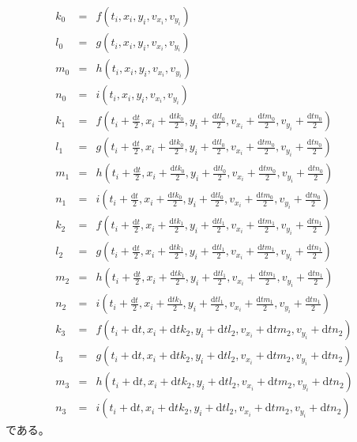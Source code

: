 \documentclass[a4paper,twoside]{jarticle}
\begin{document}
\begin{align}
  k_0&=&f\left(t_i,x_i,y_i,v_{x_{i}},v_{y_{i}}\right)\\
  l_0&=&g\left(t_i,x_i,y_i,v_{x_{i}},v_{y_{i}}\right)\\
  m_0&=&h\left(t_i,x_i,y_i,v_{x_{i}},v_{y_{i}}\right)\\
  n_0&=&i\left(t_i,x_i,y_i,v_{x_{i}},v_{y_{i}}\right)\\
  k_1&=&f\left(t_i+\frac{\mathrm{d}t}{2},x_i+\frac{\mathrm{d}tk_0}{2},y_i+\frac{\mathrm{d}tl_0}{2},v_{x_{i}}+\frac{\mathrm{d}tm_0}{2},v_{y_{i}}+\frac{\mathrm{d}tn_0}{2}\right)\\
  l_1&=&g\left(t_i+\frac{\mathrm{d}t}{2},x_i+\frac{\mathrm{d}tk_0}{2},y_i+\frac{\mathrm{d}tl_0}{2},v_{x_{i}}+\frac{\mathrm{d}tm_0}{2},v_{y_{i}}+\frac{\mathrm{d}tn_0}{2}\right)\\
  m_1&=&h\left(t_i+\frac{\mathrm{d}t}{2},x_i+\frac{\mathrm{d}tk_0}{2},y_i+\frac{\mathrm{d}tl_0}{2},v_{x_{i}}+\frac{\mathrm{d}tm_0}{2},v_{y_{i}}+\frac{\mathrm{d}tn_0}{2}\right)\\
  n_1&=&i\left(t_i+\frac{\mathrm{d}t}{2},x_i+\frac{\mathrm{d}tk_0}{2},y_i+\frac{\mathrm{d}tl_0}{2},v_{x_{i}}+\frac{\mathrm{d}tm_0}{2},v_{y_{i}}+\frac{\mathrm{d}tn_0}{2}\right)\\
  k_2&=&f\left(t_i+\frac{\mathrm{d}t}{2},x_i+\frac{\mathrm{d}tk_1}{2},y_i+\frac{\mathrm{d}tl_1}{2},v_{x_{i}}+\frac{\mathrm{d}tm_1}{2},v_{y_{i}}+\frac{\mathrm{d}tn_1}{2}\right)\\
  l_2&=&g\left(t_i+\frac{\mathrm{d}t}{2},x_i+\frac{\mathrm{d}tk_1}{2},y_i+\frac{\mathrm{d}tl_1}{2},v_{x_{i}}+\frac{\mathrm{d}tm_1}{2},v_{y_{i}}+\frac{\mathrm{d}tn_1}{2}\right)\\
  m_2&=&h\left(t_i+\frac{\mathrm{d}t}{2},x_i+\frac{\mathrm{d}tk_1}{2},y_i+\frac{\mathrm{d}tl_1}{2},v_{x_{i}}+\frac{\mathrm{d}tm_1}{2},v_{y_{i}}+\frac{\mathrm{d}tn_1}{2}\right)\\
  n_2&=&i\left(t_i+\frac{\mathrm{d}t}{2},x_i+\frac{\mathrm{d}tk_1}{2},y_i+\frac{\mathrm{d}tl_1}{2},v_{x_{i}}+\frac{\mathrm{d}tm_1}{2},v_{y_{i}}+\frac{\mathrm{d}tn_1}{2}\right)\\
  k_3&=&f\left(t_i+\mathrm{d}t,x_i+\mathrm{d}tk_2,y_i+\mathrm{d}tl_2,v_{x_{i}}+\mathrm{d}tm_2,v_{y_{i}}+\mathrm{d}tn_2\right)\\
  l_3&=&g\left(t_i+\mathrm{d}t,x_i+\mathrm{d}tk_2,y_i+\mathrm{d}tl_2,v_{x_{i}}+\mathrm{d}tm_2,v_{y_{i}}+\mathrm{d}tn_2\right)\\
  m_3&=&h\left(t_i+\mathrm{d}t,x_i+\mathrm{d}tk_2,y_i+\mathrm{d}tl_2,v_{x_{i}}+\mathrm{d}tm_2,v_{y_{i}}+\mathrm{d}tn_2\right)\\
  n_3&=&i\left(t_i+\mathrm{d}t,x_i+\mathrm{d}tk_2,y_i+\mathrm{d}tl_2,v_{x_{i}}+\mathrm{d}tm_2,v_{y_{i}}+\mathrm{d}tn_2\right)
\end{align}
である。
\end{document}
